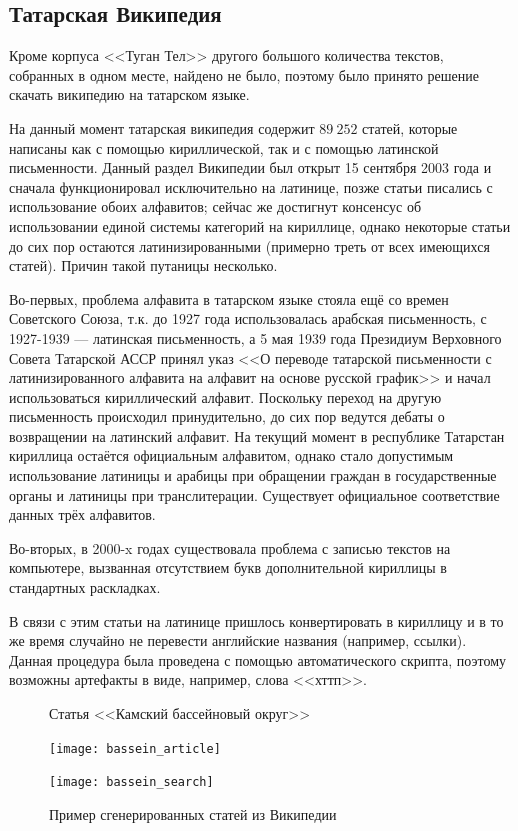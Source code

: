 \subsection{Татарская Википедия}

Кроме корпуса <<Туган Тел>> другого большого количества текстов, собранных в одном месте, найдено не было, поэтому было принято решение скачать википедию на татарском языке.

На данный момент татарская википедия содержит $89\ 252$ статей, которые написаны как с помощью кириллической, так и с помощью латинской письменности. Данный раздел Википедии был открыт 15 сентября 2003 года и сначала функционировал исключительно на латинице, позже статьи писались с использование обоих алфавитов; сейчас же достигнут консенсус об использовании единой системы категорий на кириллице, однако некоторые статьи до сих пор остаются латинизированными (примерно треть от всех имеющихся статей). Причин такой путаницы несколько. 

Во-первых, проблема алфавита в татарском языке стояла ещё со времен Советского Союза, т.к. до 1927 года использовалась арабская письменность, с 1927-1939 --- латинская письменность, а 5 мая 1939 года Президиум Верховного Совета Татарской АССР принял указ <<О переводе татарской письменности с латинизированного алфавита на алфавит на основе русской график>> и начал использоваться кириллический алфавит. Поскольку переход на другую письменность происходил принудительно, до сих пор ведутся дебаты о возвращении на латинский алфавит. На текущий момент в республике Татарстан кириллица остаётся официальным алфавитом, однако стало допустимым использование латиницы и арабицы при обращении граждан в государственные органы и латиницы при транслитерации. Существует официальное соответствие данных трёх алфавитов.

Во-вторых, в 2000-x годах существовала проблема с записью текстов на компьютере, вызванная отсутствием букв дополнительной кириллицы в стандартных раскладках.

В связи с этим статьи на латинице пришлось конвертировать в кириллицу и в то же время случайно не перевести английские названия (например, ссылки). Данная процедура была проведена с помощью автоматического скрипта, поэтому возможны артефакты в виде, например, слова <<хттп>>.

\begin{figure}[H]
\begin{minipage}{\textwidth}
\caption{Статья <<Камский бассейновый округ>>}
\texttt{[image: bassein\_article]}
\label{fig:bassein_article}
\end{minipage}

\begin{minipage}{\textwidth}
\caption{Пример сгенерированных статей из Википедии}
\texttt{[image: bassein\_search]}
\label{fig:bassein_search}
\end{minipage}
\end{figure}



